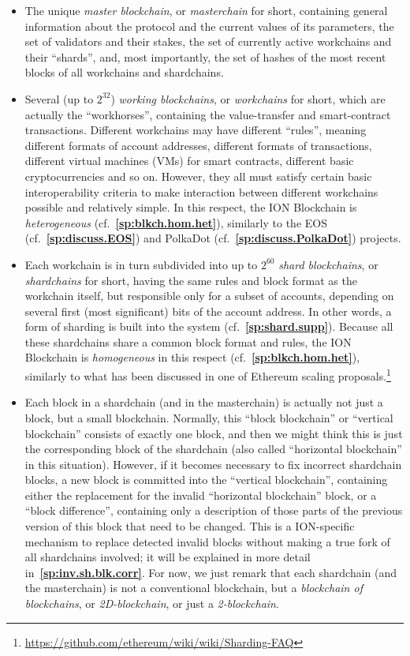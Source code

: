 \documentclass[12pt,oneside]{article}
\def\refpoint#1{{\rm\textbf{\ref{#1}}}}
\let\ptref=\refpoint
\begin{document}
\begin{itemize}
\item The unique {\em master blockchain}, or {\em masterchain\/} for
  short, containing general information about the protocol and the
  current values of its parameters, the set of validators and their
  stakes, the set of currently active workchains and their ``shards'',
  and, most importantly, the set of hashes of the most recent blocks
  of all workchains and shardchains.
\item Several (up to $2^{32}$) {\em working blockchains}, or {\em
  workchains\/} for short, which are actually the ``workhorses'',
  containing the value-transfer and smart-contract
  transactions. Different workchains may have different ``rules'',
  meaning different formats of account addresses, different formats of
  transactions, different virtual machines (VMs) for smart contracts,
  different basic cryptocurrencies and so on. However, they all must
  satisfy certain basic interoperability criteria to make interaction
  between different work\-chains possible and relatively simple. In
  this respect, the ION Blockchain is {\em heterogeneous\/}
  (cf.~\ptref{sp:blkch.hom.het}), similarly to the EOS
  (cf.~\ptref{sp:discuss.EOS}) and PolkaDot
  (cf.~\ptref{sp:discuss.PolkaDot}) projects.
\item Each workchain is in turn subdivided into up to $2^{60}$ {\em
  shard blockchains}, or {\em shardchains\/} for short, having the
  same rules and block format as the workchain itself, but responsible
  only for a subset of accounts, depending on several first (most
  significant) bits of the account address. In other words, a form of
  sharding is built into the system
  (cf.~\ptref{sp:shard.supp}). Because all these shardchains share a
  common block format and rules, the ION Blockchain is {\em
    homogeneous\/} in this respect (cf.~\ptref{sp:blkch.hom.het}),
  similarly to what has been discussed in one of Ethereum scaling
  proposals.\footnote{\url{https://github.com/ethereum/wiki/wiki/Sharding-FAQ}}
\item Each block in a shardchain (and in the masterchain) is actually
  not just a block, but a small blockchain. Normally, this ``block
  blockchain'' or ``vertical blockchain'' consists of exactly one
  block, and then we might think this is just the corresponding block
  of the shardchain (also called ``horizontal block\-chain'' in this
  situation). However, if it becomes necessary to fix incorrect
  shardchain blocks, a new block is committed into the ``vertical
  block\-chain'', containing either the replacement for the invalid
  ``horizontal blockchain'' block, or a ``block difference'',
  containing only a description of those parts of the previous version
  of this block that need to be changed. This is a ION-specific
  mechanism to replace detected invalid blocks without making a true
  fork of all shardchains involved; it will be explained in more
  detail in~\ptref{sp:inv.sh.blk.corr}. For now, we just remark that
  each shardchain (and the masterchain) is not a conventional
  blockchain, but a {\em blockchain of blockchains}, or {\em
    2D-blockchain}, or just a {\em 2-blockchain}.
\end{itemize}
\end{document}
